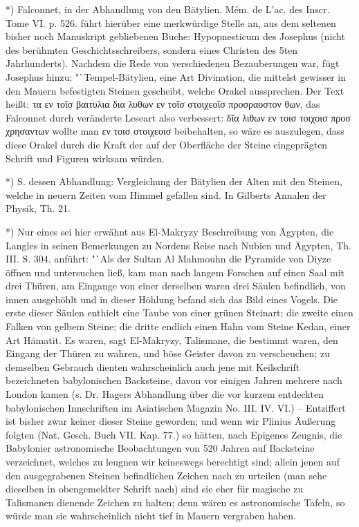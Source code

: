 \documentclass[a4paper, 11pt, oneside, polutonikogreek, german]{article}
\begin{document}
*) Falconnet, in der Abhandlung von den Bätylien. Mém. de L'ac. des Inscr. Tome VI. p. 526. führt hierüber eine merkwürdige Stelle an, aus dem seltenen bisher noch Manuskript gebliebenen Buche: Hypopnesticum des Josephus (nicht des berühmten Geschichtsschreibers, sondern eines Christen des 5ten Jahrhunderts). Nachdem die Rede von verschiedenen Bezauberungen war, fügt Josephus hinzu: "`Tempel-Bätylien, eine Art Divination, die mittelst gewisser in den Mauern befestigten Steinen gescheibt, welche Orakel aussprechen. Der Text heißt: τα εν τοῖσ βαιτυλια δια λυθων εν τοῖσ στοιχεοῖσ προσραοστον θων, das Falconnet durch veränderte Leseart also verbessert: δῖα λιθων εν τοισ τοιχοισ προσ χρησαντων wollte man εν τοισ στοιχεοισ beibehalten, so wäre es auszulegen, dass diese Orakel durch die Kraft der auf der Oberfläche der Steine eingeprägten Schrift und Figuren wirksam würden.

*) S. dessen Abhandlung: Vergleichung der Bätylien der Alten mit den Steinen, welche in neuern Zeiten vom Himmel gefallen sind. In Gilberts Annalen der Physik, Th. 21.

*) Nur eines sei hier erwähnt aus El-Makryzy Beschreibung von Ägypten, die Langles in seinen Bemerkungen zu Nordens Reise nach Nubien und Ägypten, Th. III. S. 304. anführt: "`Als der Sultan Al Mahmouhn die Pyramide von Diyze öffnen und untersuchen ließ, kam man nach langem Forschen auf einen Saal mit drei Thüren, am Eingange von einer derselben waren drei Säulen befindlich, von innen ausgehöhlt und in dieser Höhlung befand sich das Bild eines Vogels. Die erste dieser Säulen enthielt eine Taube von einer grünen Steinart; die zweite einen Falken von gelbem Steine; die dritte endlich einen Hahn vom Steine Kedan, einer Art Hämatit. Es waren, sagt El-Makryzy, Talismane, die bestimmt waren, den Eingang der Thüren zu wahren, und böse Geister davon zu verscheuchen; zu demselben Gebrauch dienten wahrscheinlich auch jene mit Keilschrift bezeichneten babylonischen Backsteine, davon vor einigen Jahren mehrere nach London kamen (s. Dr. Hagers Abhandlung über die vor kurzem entdeckten babylonischen Innschriften im Asiatischen Magazin No. III. IV. VI.) -- Entziffert ist bisher zwar keiner dieser Steine geworden; und wenn wir Plinius Äußerung folgten (Nat. Gesch. Buch VII. Kap. 77.) so hätten, nach Epigenes Zeugnis, die Babylonier astronomische Beobachtungen von 520 Jahren auf Backsteine verzeichnet, welches zu leugnen wir keineswegs berechtigt sind; allein jenen auf den ausgegrabenen Steinen befindlichen Zeichen nach zu urteilen (man sehe dieselben in obengemeldter Schrift nach) sind sie eher für magische zu Talismanen dienende Zeichen zu halten; denn wären es astronomische Tafeln, so würde man sie wahrscheinlich nicht tief in Mauern vergraben haben.
\end{document}
